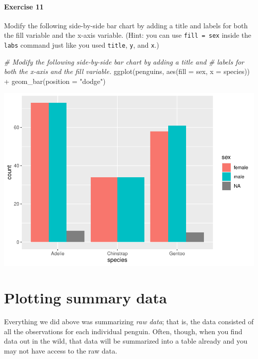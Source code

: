 \documentclass[
]{book}
\newenvironment{Shaded}{\begin{snugshade}}{\end{snugshade}}
\newcommand{\AttributeTok}[1]{\textcolor[rgb]{0.77,0.63,0.00}{#1}}
\newcommand{\CommentTok}[1]{\textcolor[rgb]{0.56,0.35,0.01}{\textit{#1}}}
\newcommand{\FunctionTok}[1]{\textcolor[rgb]{0.00,0.00,0.00}{#1}}
\newcommand{\NormalTok}[1]{#1}
\newcommand{\SpecialCharTok}[1]{\textcolor[rgb]{0.00,0.00,0.00}{#1}}
\newcommand{\StringTok}[1]{\textcolor[rgb]{0.31,0.60,0.02}{#1}}
\begin{document}
\hypertarget{exercise-11}{%
\paragraph*{Exercise 11}\label{exercise-11}}

Modify the following side-by-side bar chart by adding a title and labels for both the fill variable and the x-axis variable. (Hint: you can use \texttt{fill\ =\ sex} inside the \texttt{labs} command just like you used \texttt{title}, \texttt{y}, and \texttt{x}.)

\begin{Shaded}
\begin{Highlighting}[]
\CommentTok{\# Modify the following side{-}by{-}side bar chart by adding a title and }
\CommentTok{\# labels for both the x{-}axis and the fill variable.}
\FunctionTok{ggplot}\NormalTok{(penguins, }\FunctionTok{aes}\NormalTok{(}\AttributeTok{fill =}\NormalTok{ sex, }\AttributeTok{x =}\NormalTok{ species)) }\SpecialCharTok{+}
    \FunctionTok{geom\_bar}\NormalTok{(}\AttributeTok{position =} \StringTok{"dodge"}\NormalTok{)}
\end{Highlighting}
\end{Shaded}

\includegraphics{intro_stats_files/figure-latex/unnamed-chunk-72-1.pdf}

\hypertarget{categorical-summary}{%
\section{Plotting summary data}\label{categorical-summary}}

Everything we did above was summarizing \emph{raw data}; that is, the data consisted of all the observations for each individual penguin. Often, though, when you find data out in the wild, that data will be summarized into a table already and you may not have access to the raw data.
\end{document}
